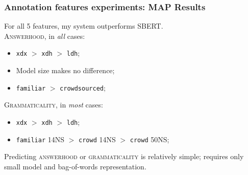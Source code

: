 \documentclass[handout,xcolor={dvipsnames}]{beamer}
\newcommand{\feat}[1]{\textsc{#1}}
\newcommand{\param}[1]{\texttt{#1}}
\begin{document}
\begin{frame}
\frametitle{Annotation features experiments: MAP Results}
\vspace{-1em}

\pause
For all 5 features, my system outperforms SBERT. \\

\vspace{1em}
\pause
\feat{Answerhood}, in \textit{all} cases:
\begin{itemize}
\pause
\item \param{xdx} $>$ \param{xdh} $>$ \param{ldh};
\pause
\item Model size makes no difference;
\pause
\item \param{familiar} $>$ \param{crowdsourced};
\end{itemize}

\vspace{1em}

\pause
\feat{Grammaticality}, in \textit{most} cases:
\begin{itemize}
\pause
\item \param{xdx} $>$ \param{xdh} $>$ \param{ldh};
\pause
\item \param{familiar} 14NS $>$ \param{crowd} 14NS $>$ \param{crowd} 50NS;
\end{itemize}

\vspace{1em}

\pause
Predicting \feat{answerhood} or \feat{grammaticality} is relatively simple; requires only small model and bag-of-words representation.

\end{frame}
\end{document}
